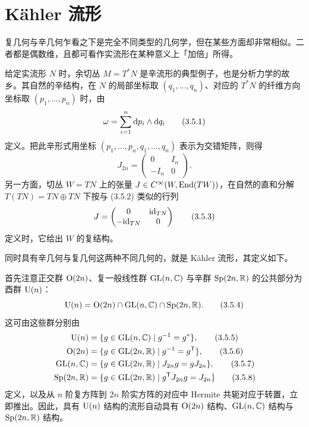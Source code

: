 
\section{Kähler 流形}

复几何与辛几何乍看之下是完全不同类型的几何学，但在某些方面却非常相似。二者都是偶数维，且都可看作实流形在某种意义上「加倍」所得。

给定实流形 $N$ 时，余切丛 $M=T^*N$ 是辛流形的典型例子，也是分析力学的故乡。其自然的辛结构，在 $N$ 的局部坐标取 $(q_1,\dots,q_n)$、对应的 $T^*N$ 的纤维方向坐标取 $(p_1,\dots,p_n)$ 时，由
\begin{equation}
  \omega=\sum_{i=1}^{n}\mathrm{d} p_i\wedge \mathrm{d} q_i
  \tag{3.5.1}
\end{equation}
定义。把此辛形式用坐标 $(p_1,\dots,p_n,q_1,\dots,q_n)$ 表示为交错矩阵，则得
\begin{equation}
  J_{2n}=\begin{pmatrix}0 & I_n\\ -I_n & 0\end{pmatrix}.
  \tag{3.5.2}
\end{equation}
另一方面，切丛 $W=TN$ 上的张量 $J\in C^\infty(W,\operatorname{End}(TW))$，在自然的直和分解 $T(TN)=TN\oplus TN$ 下按与 (3.5.2) 类似的行列
\begin{equation}
  J=\begin{pmatrix}0 & \mathrm{id}_{TN}\\ -\mathrm{id}_{TN} & 0\end{pmatrix}
  \tag{3.5.3}
\end{equation}
定义时，它给出 $W$ 的复结构。

同时具有辛几何与复几何这两种不同几何的，就是 Kähler 流形，其定义如下。

首先注意正交群 $\operatorname{O}(2n)$、复一般线性群 $\operatorname{GL}(n,\mathbb{C})$ 与辛群 $\operatorname{Sp}(2n,\mathbb{R})$ 的公共部分为酉群 $\operatorname{U}(n)$：
\begin{equation}
  \operatorname{U}(n)=\operatorname{O}(2n)\cap \operatorname{GL}(n,\mathbb{C})\cap \operatorname{Sp}(2n,\mathbb{R}).
  \tag{3.5.4}
\end{equation}
这可由这些群分别由
\begin{align}
  \operatorname{U}(n)&=\{g\in \operatorname{GL}(n,\mathbb{C})\mid g^{-1}=g^*\}, \tag{3.5.5}\\
  \operatorname{O}(2n)&=\{g\in \operatorname{GL}(2n,\mathbb{R})\mid g^{-1}=g^{\mathsf T}\}, \tag{3.5.6}\\
  \operatorname{GL}(n,\mathbb{C})&=\{g\in \operatorname{GL}(2n,\mathbb{R})\mid J_{2n}g=gJ_{2n}\}, \tag{3.5.7}\\
  \operatorname{Sp}(2n,\mathbb{R})&=\{g\in \operatorname{GL}(2n,\mathbb{R})\mid g^{\mathsf T}J_{2n}g=J_{2n}\} \tag{3.5.8}
\end{align}
定义，以及从 $n$ 阶复方阵到 $2n$ 阶实方阵的对应中 Hermite 共轭对应于转置，立即推出。因此，具有 $\operatorname{U}(n)$ 结构的流形自动具有 $\operatorname{O}(2n)$ 结构、$\operatorname{GL}(n,\mathbb{C})$ 结构与 $\operatorname{Sp}(2n,\mathbb{R})$ 结构。

